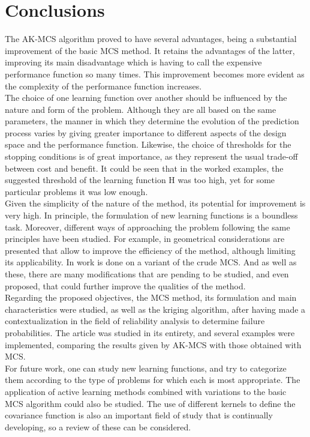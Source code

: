 \chapter{Conclusions}
The AK-MCS algorithm proved to have several advantages, being a substantial
improvement of the basic MCS method. It retains the advantages of the latter,
improving its main disadvantage which is having to call the expensive performance
function so many times. This improvement becomes more evident as the complexity of the performance function increases.\\

The choice of one learning function over another should be influenced by the
nature and form of the problem. Although they are all based on the same parameters,
the manner in which they determine the evolution of the prediction process varies
by giving greater importance to different aspects of the design space and the performance
function. Likewise, the choice of thresholds for the stopping conditions is of great importance,
as they represent the usual trade-off between cost and benefit. It could be seen that in
the worked examples, the suggested threshold of the learning function H was too high,
yet for some particular problems it was low enough. \\

Given the simplicity of the nature of the method, its potential for improvement
is very high. In principle, the formulation of new learning functions is a
boundless task. Moreover, different ways of approaching the problem following the
same principles have been studied. For example, in \citep{Peijuan2017} geometrical considerations
are presented that allow to improve the efficiency of the method, although limiting
its applicability. In \citep{Balesdent2013} work is done on a variant of the crude MCS. And as well
as these, there are many modifications that are pending to be studied, and even
proposed, that could further improve the qualities of the method. \\

Regarding the proposed objectives, the MCS method, its formulation and main characteristics were studied, as well as the kriging algorithm, after having made a contextualization in the field of reliability analysis to determine failure probabilities. The article \citep{Echard2011} was studied in its entirety, and several examples were implemented, comparing the results given by AK-MCS with those obtained with MCS. \\

For future work, one can study new learning functions, and try to categorize them according to the type of problems for which each is most appropriate. The application of active learning methods combined with variations to the basic MCS algorithm could also be studied. The use of different kernels to define the covariance function is also an important field of study that is continually developing, so a review of these can be considered.